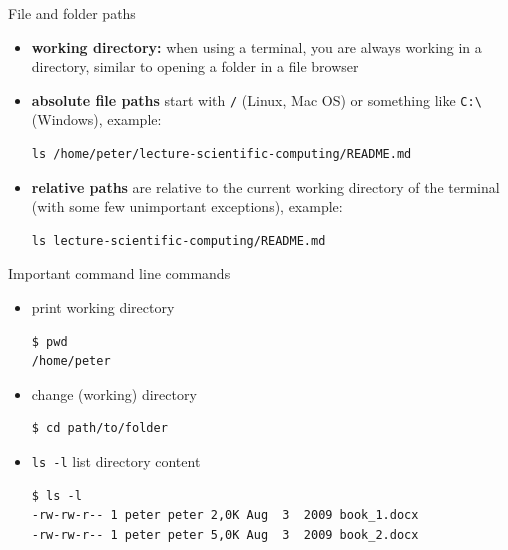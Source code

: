 \begin{frame}[fragile]{File and folder paths}
    \begin{itemize}
        \item {\bf working directory:} when using a terminal, you are always working in a
            directory, similar to opening a folder in a file browser
        \item {\bf absolute file paths} start with \verb|/| (Linux, Mac OS) or something like \verb|C:\|
            (Windows), example:
            {\small
            \begin{verbatim}ls /home/peter/lecture-scientific-computing/README.md \end{verbatim}}
        \item {\bf relative paths} are relative to the current working directory of the terminal (with some few unimportant exceptions), example:
            {\small
            \begin{verbatim}ls lecture-scientific-computing/README.md\end{verbatim}}
    \end{itemize}

\end{frame}

\begin{frame}[fragile]{Important command line commands}
    \begin{itemize}
        \item print working directory
\begin{verbatim}$ pwd
/home/peter
\end{verbatim}
        \item change (working) directory
\begin{verbatim}$ cd path/to/folder\end{verbatim}
        \item \verb|ls -l| list directory content
\begin{verbatim}$ ls -l
-rw-rw-r-- 1 peter peter 2,0K Aug  3  2009 book_1.docx
-rw-rw-r-- 1 peter peter 5,0K Aug  3  2009 book_2.docx
\end{verbatim}
    \end{itemize}
\end{frame}


